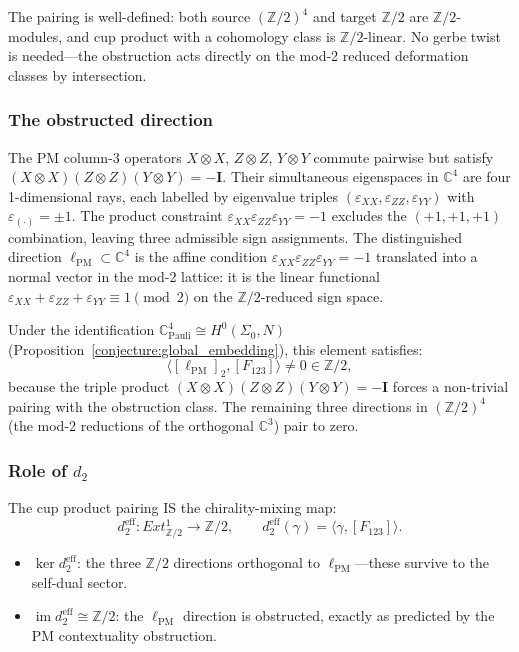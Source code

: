 \documentclass[11pt,a4paper]{article}
\theoremstyle{remark}
\newcommand{\C}{\mathbb{C}}
\newcommand{\Z}{\mathbb{Z}}
\begin{document}
The pairing is well-defined: both source $(\Z/2)^4$ and target
$\Z/2$ are $\Z/2$-modules, and cup product with a cohomology class
is $\Z/2$-linear. No gerbe twist is needed---the obstruction acts
directly on the mod-2 reduced deformation classes by intersection.

\subsubsection*{The obstructed direction}

The PM column-3 operators $X \otimes X$, $Z \otimes Z$, $Y \otimes Y$
commute pairwise but satisfy $(X \otimes X)(Z \otimes Z)(Y \otimes Y)
= -\mathbf{I}$.  Their simultaneous eigenspaces in $\C^4$ are four
1-dimensional rays, each labelled by eigenvalue triples
$(\varepsilon_{XX}, \varepsilon_{ZZ}, \varepsilon_{YY})$ with
$\varepsilon_{(\cdot)} = \pm 1$.  The product constraint
$\varepsilon_{XX}\varepsilon_{ZZ}\varepsilon_{YY} = -1$ excludes
the $(+1,+1,+1)$ combination, leaving three admissible
sign assignments.  The distinguished direction
$\ell_{\text{PM}} \subset \C^4$ is the affine condition
$\varepsilon_{XX}\varepsilon_{ZZ}\varepsilon_{YY} = -1$ translated
into a normal vector in the mod-2 lattice: it is the linear
functional $\varepsilon_{XX} + \varepsilon_{ZZ} + \varepsilon_{YY}
\equiv 1 \pmod 2$ on the $\Z/2$-reduced sign space.

Under the identification $\C^4_{\text{Pauli}} \cong
H^0(\Sigma_0, N)$ (Proposition~\ref{conjecture:global_embedding}),
this element satisfies:
\[
  \langle [\ell_{\text{PM}}]_2, [F_{123}] \rangle \neq 0
  \in \Z/2,
\]
because the triple product $(X \otimes X)(Z \otimes Z)(Y \otimes Y)
= -\mathbf{I}$ forces a non-trivial pairing with the obstruction
class. The remaining three directions in $(\Z/2)^4$ (the mod-2
reductions of the orthogonal $\C^3$) pair to zero.

\subsubsection*{Role of $d_2$}

The cup product pairing IS the chirality-mixing map:
\[
  d_2^{\text{eff}}: Ext^1_{\Z/2} \to \Z/2,
  \qquad
  d_2^{\text{eff}}(\gamma) = \langle \gamma, [F_{123}] \rangle.
\]

\begin{itemize}
  \item $\ker d_2^{\text{eff}}$: the three $\Z/2$ directions
    orthogonal to $\ell_{\text{PM}}$---these survive to the
    self-dual sector.
  \item $\operatorname{im} d_2^{\text{eff}} \cong \Z/2$:
    the $\ell_{\text{PM}}$ direction is obstructed, exactly
    as predicted by the PM contextuality obstruction.
\end{itemize}
\end{document}
